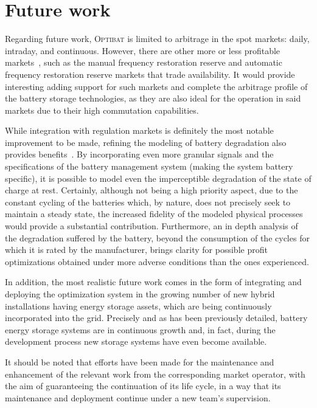 \section*{Future work}

Regarding future work, \textsc{Optibat} is limited to arbitrage in the spot markets: daily, intraday, and continuous. However, there are other more or less profitable markets~\cite{cnmc2024balance}, such as the manual frequency restoration reserve and automatic frequency restoration reserve markets that trade availability. It would provide interesting adding support for such markets and complete the arbitrage profile of the battery storage technologies, as they are also ideal for the operation in said markets due to their high commutation capabilities.

While integration with regulation markets is definitely the most notable improvement to be made, refining the modeling of battery degradation also provides benefits~\cite{shamarova2022review}. By incorporating even more granular signals and the specifications of the battery management system (making the system battery specific), it is possible to model even the imperceptible degradation of the state of charge at rest. Certainly, although not being a high priority aspect, due to the constant cycling of the batteries which, by nature, does not precisely seek to maintain a steady state, the increased fidelity of the modeled physical processes would provide a substantial contribution. Furthermore, an in depth analysis of the degradation suffered by the battery, beyond the consumption of the cycles for which it is rated by the manufacturer, brings clarity for possible profit optimizations obtained under more adverse conditions than the ones experienced.

In addition, the most realistic future work comes in the form of integrating and deploying the optimization system in the growing number of new hybrid installations having energy storage assets, which are being continuously incorporated into the grid. Precisely and as has been previously detailed, battery energy storage systems are in continuous growth and, in fact, during the development process new storage systems have even become available.

It should be noted that efforts have been made for the maintenance and enhancement of the relevant work from the corresponding market operator, with the aim of guaranteeing the continuation of its life cycle, in a way that its maintenance and deployment continue under a new team's supervision.

